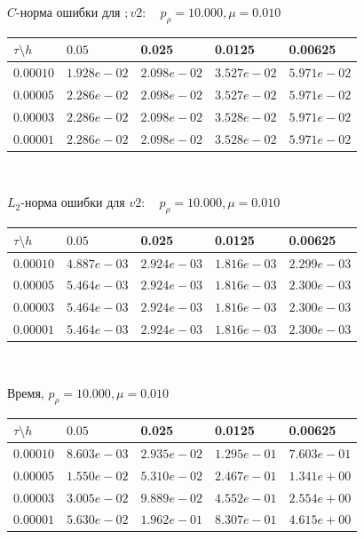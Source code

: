 \documentclass[a4paper, 25pt]{article}
\begin{document}
\begin{center}
 $C$-норма ошибки для $;v2: \quad p_{\rho}=10.000, \mu = 0.010 $
\begin{tabular}{|p{0.6in}|p{0.7in}|p{0.7in}|p{0.7in}|p{0.7in}|} \hline
$\tau\setminus h$ & $0.05$ & 0.025& 0.0125 & 0.00625 \\ \hline
$0.00010$ & $1.928e-02$ &$2.098e-02$ &$3.527e-02$ &$5.971e-02$  \\ \hline
$0.00005$ & $2.286e-02$ &$2.098e-02$ &$3.527e-02$ &$5.971e-02$  \\ \hline
$0.00003$ & $2.286e-02$ &$2.098e-02$ &$3.528e-02$ &$5.971e-02$  \\ \hline
$0.00001$ & $2.286e-02$ &$2.098e-02$ &$3.528e-02$ &$5.971e-02$  \\ \hline
\end{tabular}\\[20pt]
\end{center}

\begin{center}
$L_2$-норма ошибки для $v2: \quad p_{\rho}=10.000, \mu = 0.010  $
\begin{tabular}{|p{0.6in}|p{0.7in}|p{0.7in}|p{0.7in}|p{0.7in}|} \hline
$\tau\setminus h$ & $0.05$ & 0.025& 0.0125 & 0.00625 \\ \hline
$0.00010$ & $4.887e-03$ &$2.924e-03$ &$1.816e-03$ &$2.299e-03$  \\ \hline
$0.00005$ & $5.464e-03$ &$2.924e-03$ &$1.816e-03$ &$2.300e-03$  \\ \hline
$0.00003$ & $5.464e-03$ &$2.924e-03$ &$1.816e-03$ &$2.300e-03$  \\ \hline
$0.00001$ & $5.464e-03$ &$2.924e-03$ &$1.816e-03$ &$2.300e-03$  \\ \hline
\end{tabular}\\[20pt]
\end{center}

\begin{center}
Время, $p_{\rho}=10.000, \mu = 0.010  $
\begin{tabular}{|p{0.6in}|p{0.7in}|p{0.7in}|p{0.7in}|p{0.7in}|} \hline
$\tau\setminus h$ & $0.05$ & 0.025& 0.0125 & 0.00625 \\ \hline
$0.00010$ & $8.603e-03$ &$2.935e-02$ &$1.295e-01$ &$7.603e-01$  \\ \hline
$0.00005$ & $1.550e-02$ &$5.310e-02$ &$2.467e-01$ &$1.341e+00$  \\ \hline
$0.00003$ & $3.005e-02$ &$9.889e-02$ &$4.552e-01$ &$2.554e+00$  \\ \hline
$0.00001$ & $5.630e-02$ &$1.962e-01$ &$8.307e-01$ &$4.615e+00$  \\ \hline
\end{tabular}\\[20pt]
\end{center}
\end{document}
